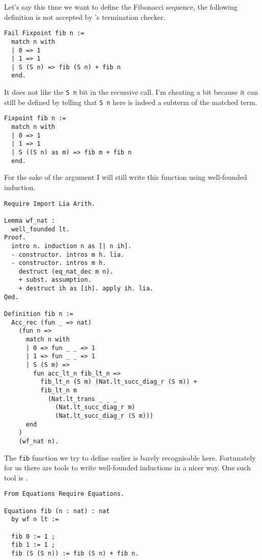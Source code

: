 Let's say this time we want to define the Fibonacci sequence, the following
definition is not accepted by \Coq's termination checker.
\begin{verbatim}
Fail Fixpoint fib n :=
  match n with
  | 0 => 1
  | 1 => 1
  | S (S n) => fib (S n) + fib n
  end.
\end{verbatim}
It does not like the \texttt{S n} bit in the recursive call.
I'm cheating a bit because it can still be defined by telling \Coq that
\texttt{S n} here is indeed a subterm of the matched term.
\begin{verbatim}
Fixpoint fib n :=
  match n with
  | 0 => 1
  | 1 => 1
  | S ((S n) as m) => fib m + fib n
  end.
\end{verbatim}
For the sake of the argument I will still write this function using well-founded
induction.
\begin{verbatim}
Require Import Lia Arith.

Lemma wf_nat :
  well_founded lt.
Proof.
  intro n. induction n as [| n ih].
  - constructor. intros m h. lia.
  - constructor. intros m h.
    destruct (eq_nat_dec m n).
    + subst. assumption.
    + destruct ih as [ih]. apply ih. lia.
Qed.

Definition fib n :=
  Acc_rec (fun _ => nat)
    (fun n =>
      match n with
      | 0 => fun _ _ => 1
      | 1 => fun _ _ => 1
      | S (S m) =>
        fun acc_lt_n fib_lt_n =>
          fib_lt_n (S m) (Nat.lt_succ_diag_r (S m)) +
          fib_lt_n m
            (Nat.lt_trans _ _ _
              (Nat.lt_succ_diag_r m)
              (Nat.lt_succ_diag_r (S m)))
      end
    )
    (wf_nat n).
\end{verbatim}
The \texttt{fib} function we try to define earlier is barely
recognisable here. Fortunately for us there are tools to write well-founded
inductions in a nicer way. One such tool is \Equations.
\begin{verbatim}
From Equations Require Equations.

Equations fib (n : nat) : nat
  by wf n lt :=

  fib 0 := 1 ;
  fib 1 := 1 ;
  fib (S (S n)) := fib (S n) + fib n.
\end{verbatim}
